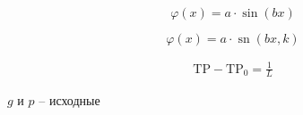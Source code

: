 \documentclass[trans]{beamer}
\DeclareMathOperator{\sn}{sn}
\begin{document}
\begin{frame}
\begin{equation*}
\varphi(x) = a \cdot \sin(bx)
\end{equation*}

\begin{equation*}
\varphi(x) = a  \cdot \sn(bx, k)
\end{equation*}

\begin{align*}
\mathrm{TP} - \mathrm{TP}_0 = \frac{1}{L}
\end{align*}
 
\center
$g$ и $p$ -- исходные

\end{frame}
\end{document}
